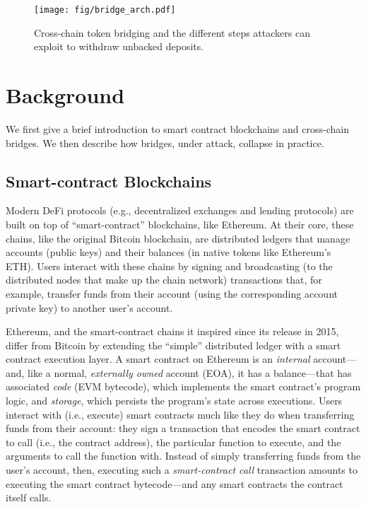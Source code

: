 \begin{figure}[h]
\centering
\texttt{[image: fig/bridge\_arch.pdf]}
\caption[Cross-chain Token Bridging]{Cross-chain token bridging and the different steps attackers can exploit to withdraw unbacked deposits.}
\label{fig:cross-chain}
\end{figure}

\section{Background}
\label{sec:background}
We first give a brief introduction to smart contract blockchains
and cross-chain bridges. We then describe how bridges, under attack, collapse in
practice.

\subsection{Smart-contract Blockchains} Modern DeFi protocols (e.g.,
decentralized exchanges and lending protocols) are built on top
of ``smart-contract'' blockchains, like Ethereum. At their core, these chains, like
the original Bitcoin blockchain, are distributed ledgers that manage accounts
(public keys) and their balances (in native tokens like Ethereum's ETH). Users
interact with these chains by signing and broadcasting (to the distributed nodes
that make up the chain network) transactions that, for example, transfer
funds from their account (using the corresponding account private key) to
another user's account.

Ethereum, and the smart-contract chains it inspired since its release in 2015,
differ from Bitcoin by extending the ``simple'' distributed ledger with a smart
contract execution layer. A smart contract on Ethereum is an \emph{internal}
account---and, like a normal, \emph{externally owned} account (EOA), it has a
balance---that has associated \emph{code} (EVM bytecode), which implements the
smart contract's program logic, and \emph{storage}, which persists the program's
state across executions. Users interact with (i.e., execute) smart contracts
much like they do when transferring funds from their account: they sign a
transaction that encodes the smart contract to call (i.e., the contract address),
the particular function to execute, and the arguments to call the function with.
Instead of simply transferring funds from the user's account, then, executing
such a \emph{smart-contract call} transaction amounts to executing the smart
contract bytecode---and any smart contracts the contract itself calls.
    
